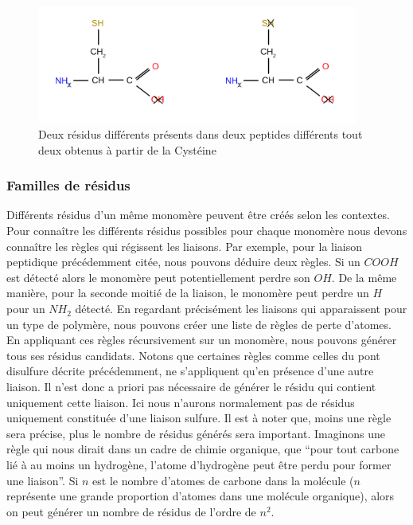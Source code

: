 \begin{figure}[!ht]
  \begin{center}
    \includegraphics[width=400px]{Figures/s2m/residues/cys_exemple.png}
    \caption{\label{cys_ex}Deux résidus différents présents dans deux peptides différents tout deux obtenus à partir de la Cystéine}
  \end{center}
\end{figure}


\subsubsection{Familles de résidus}

Différents résidus d'un même monomère peuvent être créés selon les contextes.
Pour connaître les différents résidus possibles pour chaque monomère nous devons connaître les règles qui régissent les liaisons.
Par exemple, pour la liaison peptidique précédemment citée, nous pouvons déduire deux règles.
Si un $COOH$ est détecté alors le monomère peut potentiellement perdre son $OH$.
De la même manière, pour la seconde moitié de la liaison, le monomère peut perdre un $H$ pour un $NH_2$ détecté.
En regardant précisément les liaisons qui apparaissent pour un type de polymère, nous pouvons créer une liste de règles de perte d'atomes.
En appliquant ces règles récursivement sur un monomère, nous pouvons générer tous ses résidus candidats.
Notons que certaines règles comme celles du pont disulfure décrite précédemment, ne s'appliquent qu'en présence d'une autre liaison.
Il n'est donc a priori pas nécessaire de générer le résidu qui contient uniquement cette liaison.
Ici nous n'aurons normalement pas de résidus uniquement constituée d'une liaison sulfure.
Il est à noter que, moins une règle sera précise, plus le nombre de résidus générés sera important.
Imaginons une règle qui nous dirait dans un cadre de chimie organique, que ``pour tout carbone lié à au moins un hydrogène, l'atome d'hydrogène peut être perdu pour former une liaison''.
Si $n$ est le nombre d'atomes de carbone dans la molécule ($n$ représente une grande proportion d'atomes dans une molécule organique), alors on peut générer un nombre de résidus de l'ordre de $n^2$.


